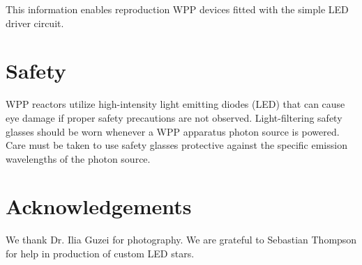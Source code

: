 \documentclass[11pt]{article}
\let\stdsection\section
\renewcommand\section{\clearpage\stdsection}
\begin{document}
This information enables reproduction WPP devices fitted with the simple LED driver circuit.

\section{Safety}

WPP reactors utilize high-intensity light emitting diodes (LED) that can cause eye damage if proper safety precautions are not observed.
Light-filtering safety glasses should be worn whenever a WPP apparatus photon source is powered.
Care must be taken to use safety glasses protective against the specific emission wavelengths of the photon source.

\section{Acknowledgements}

We thank Dr. Ilia Guzei for photography. We are grateful to Sebastian Thompson for help in production of custom LED stars. 
\end{document}
